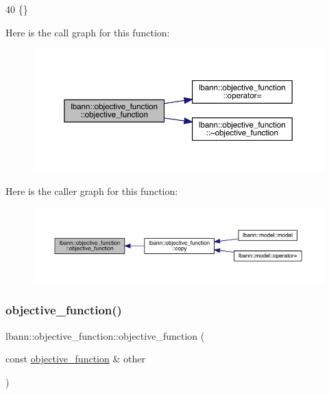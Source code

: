 \begin{DoxyCode}
40 \{\}
\end{DoxyCode}
Here is the call graph for this function\+:\nopagebreak
\begin{figure}[H]
\begin{center}
\leavevmode
\includegraphics[width=350pt]{classlbann_1_1objective__function_a89e96fddff19f13a6d3acafe4394fd65_cgraph}
\end{center}
\end{figure}
Here is the caller graph for this function\+:\nopagebreak
\begin{figure}[H]
\begin{center}
\leavevmode
\includegraphics[width=350pt]{classlbann_1_1objective__function_a89e96fddff19f13a6d3acafe4394fd65_icgraph}
\end{center}
\end{figure}
\mbox{\label{classlbann_1_1objective__function_a67523a368d2fc31d8be9081139ec0a73}} 
\subsubsection{\texorpdfstring{objective\+\_\+function()}{objective\_function()}\hspace{0.1cm}{\footnotesize\ttfamily [2/2]}}
{\footnotesize\ttfamily lbann\+::objective\+\_\+function\+::objective\+\_\+function (\begin{DoxyParamCaption}\item[{const \hyperlink{classlbann_1_1objective__function}{objective\+\_\+function} \&}]{other }\end{DoxyParamCaption})}

